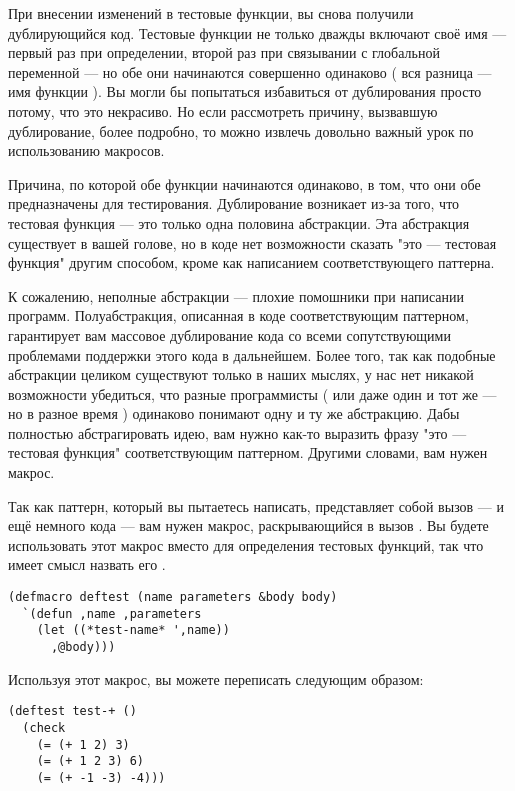 При внесении изменений в тестовые функции, вы снова получили дублирующийся код. Тестовые
функции не только дважды включают своё имя --- первый раз при определении, второй раз при
связывании с глобальной переменной  --- но обе они начинаются совершенно
одинаково ( вся разница --- имя функции ). Вы могли бы попытаться избавиться от
дублирования просто потому, что это некрасиво. Но если рассмотреть причину, вызвавшую
дублирование, более подробно, то можно извлечь довольно важный урок по использованию
макросов.

Причина, по которой обе функции начинаются одинаково, в том, что они обе предназначены для
тестирования. Дублирование возникает из-за того, что тестовая функция --- это только одна
половина абстракции. Эта абстракция существует в вашей голове, но в коде нет возможности
сказать "это --- тестовая функция" другим способом, кроме как написанием соответствующего
паттерна.

К сожалению, неполные абстракции --- плохие помошники при написании
программ. Полуабстракция, описанная в коде соответствующим паттерном, гарантирует вам
массовое дублирование кода со всеми сопутствующими проблемами поддержки этого кода в
дальнейшем. Более того, так как подобные абстракции целиком существуют только в наших
мыслях, у нас нет никакой возможности убедиться, что разные программисты ( или даже один и
тот же --- но в разное время ) одинаково понимают одну и ту же абстракцию. Дабы полностью
абстрагировать идею, вам нужно как-то выразить фразу "это --- тестовая функция"
соответствующим паттерном. Другими словами, вам нужен макрос.

Так как паттерн, который вы пытаетесь написать, представляет собой вызов  ---
и ещё немного кода --- вам нужен макрос, раскрывающийся в вызов . Вы будете
использовать этот макрос вместо  для определения тестовых функций, так что
имеет смысл назвать его .

\begin{lstlisting}
(defmacro deftest (name parameters &body body)
  `(defun ,name ,parameters
    (let ((*test-name* ',name))
      ,@body)))
\end{lstlisting}

Используя этот макрос, вы можете переписать  следующим образом:

\begin{lstlisting}
(deftest test-+ ()
  (check
    (= (+ 1 2) 3)
    (= (+ 1 2 3) 6)
    (= (+ -1 -3) -4)))
\end{lstlisting}


